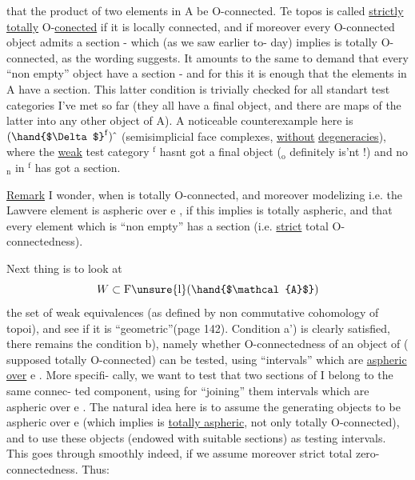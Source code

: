 
that the product of two elements in A be O-connected.  Te topos is called
\uline{strictly} \uline{totally} O-\uline{conected}  if it is locally connected,  and if moreover
every O-connected object admits a section  -  which (as we saw earlier to-%
day) implies  is totally O-connected,  as the wording suggests.  It
amounts to the same to demand that every ``non empty'' object have a section
-  and for this it is enough that the elements in A have a section.  This
latter condition is trivially checked for all standart test categories
I've met so far  (they all have a final object,  and there are maps of the
latter into any other object of A).  A noticeable counterexample here is
$(\hand{$\Delta$}^{\mathrm{f}})\hat{\ }$ (semisimplicial face complexes,  \uline{without} \uline{degeneracies}),  where 
the \uline{weak} test category \hand{$\Delta$}$^{\mathrm{f}}$ hasnt got a final object  (\hand{$\Delta$}$_{\mathrm{o}}$ definitely
 is'nt !)  and no \hand{$\Delta$}$_{\mathrm{n}}$ in \hand{$\Delta$}$^{\mathrm{f}}$  has got a section.

\uline{Remark}  I wonder,  when  is totally O-connected, and moreover modelizing
i.e. the Lawvere element is aspheric over e ,  if this implies  is
totally aspheric,  and that every element  which is ``non empty'' has a
section (i.e. \uline{strict} total O-connectedness).  

Next thing is to look at
\[ W \subset \mathrm{F}\unsure{\mathrm{l}}(\hand{$\mathcal{A}$}) \]
the set of weak equivalences (as defined by non commutative cohomology
of topoi),  and see if it is ``geometric''(page 142).  Condition a') is 
clearly satisfied,  there remains the condition b),  namely whether
O-connectedness of an object of  ( supposed totally O-connected) can
be tested,  using ``intervals'' which are \uline{aspheric over} e .  More specifi-%
cally,  we want to test that two sections of I belong to the same connec-%
ted component,  using for ``joining'' them intervals which are aspheric
over e .  The natural idea here is to assume the generating objects 
to be aspheric over e (which implies  is \uline{totally aspheric},  not only
totally O-connected),  and to use these objects (endowed with suitable
sections) as testing intervals.  This goes through smoothly indeed,  if
we assume  moreover strict total zero-connectedness.  Thus:

